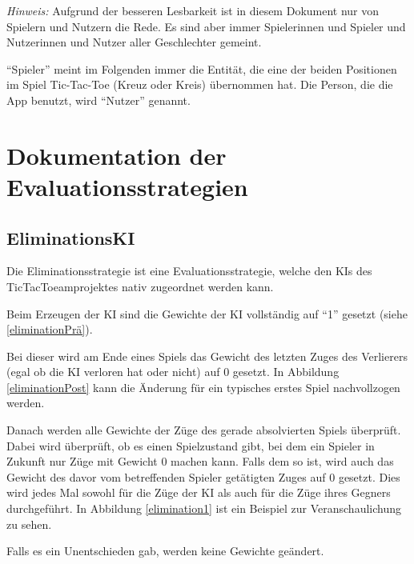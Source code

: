 \documentclass[titlepage]{scrartcl}
\title{\TicTacToe}
\subtitle{Dokumentation}
\date{Stand: \today}
\author{Jonas, Luis, Leonid}
\begin{document}
\maketitle

\emph{Hinweis:} Aufgrund der besseren Lesbarkeit ist in diesem Dokument nur von Spielern und Nutzern die Rede.
Es sind aber immer Spielerinnen und Spieler und Nutzerinnen und Nutzer aller Geschlechter gemeint.

"`Spieler"' meint im Folgenden immer die Entität, die eine der beiden Positionen im Spiel Tic-Tac-Toe (Kreuz oder Kreis) übernommen hat.
Die Person, die die App benutzt, wird "`Nutzer"' genannt.
\section{Dokumentation der Evaluationsstrategien}
\subsection{EliminationsKI}
Die Eliminationsstrategie ist eine Evaluationsstrategie, welche den KIs des TicTacToeamprojektes nativ zugeordnet werden kann.

Beim Erzeugen der KI sind die Gewichte der KI vollständig auf "`1"' gesetzt (siehe \ref{eliminationPrä}).

Bei dieser wird am Ende eines Spiels das Gewicht des letzten Zuges des Verlierers (egal ob die KI verloren hat oder nicht) auf \glqq{}0\grqq{} gesetzt.
In Abbildung \ref{eliminationPost} kann die Änderung für ein typisches erstes Spiel nachvollzogen werden.

Danach werden alle Gewichte der Züge des gerade absolvierten Spiels überprüft. Dabei wird überprüft, ob es einen Spielzustand gibt, bei dem ein Spieler in Zukunft nur Züge mit Gewicht 0 machen kann. Falls dem so ist, wird auch das Gewicht des davor vom betreffenden Spieler getätigten Zuges auf \glqq{}0\grqq{} gesetzt. Dies wird jedes Mal sowohl für die Züge der KI als auch für die Züge ihres Gegners durchgeführt. In Abbildung \ref{elimination1} ist ein Beispiel zur Veranschaulichung zu sehen.

Falls es ein Unentschieden gab, werden keine Gewichte geändert. 
\end{document}
